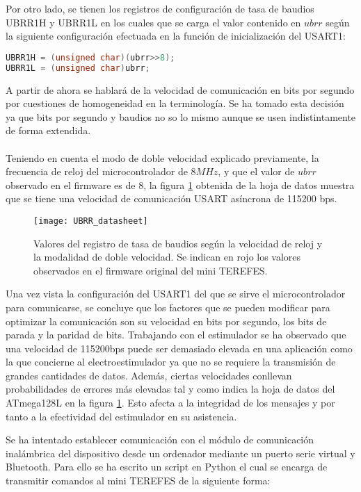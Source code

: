 Por otro lado, se tienen los registros de configuración de tasa de baudios UBRR1H y UBRR1L en los cuales que se carga el valor contenido en $ubrr$ según la siguiente configuración efectuada en la función de inicialización del USART1:\\

\begin{lstlisting}[language=C++,breaklines]
UBRR1H = (unsigned char)(ubrr>>8);
UBRR1L = (unsigned char)ubrr;
\end{lstlisting}

A partir de ahora se hablará de la velocidad de comunicación en bits por segundo por cuestiones de homogeneidad en la terminología. Se ha tomado esta decisión ya que bits por segundo y baudios no so lo mismo aunque se usen indistintamente de forma extendida.
\\
\\
Teniendo en cuenta el modo de doble velocidad explicado previamente, la frecuencia de reloj del microcontrolador de $8MHz$, y que el valor de $ubrr$ observado en el firmware es de 8, la figura \ref{fig:UBRR_datasheet} obtenida de la hoja de datos muestra que se tiene una velocidad de comunicación USART asíncrona de 115200 bps.\\

\begin{figure}[!htb]
\centering
\texttt{[image: UBRR\_datasheet]}
  \caption{Valores del registro de tasa de baudios según la velocidad de reloj y la modalidad de doble velocidad. Se indican en rojo los valores observados en el firmware original del mini TEREFES.}\label{fig:UBRR_datasheet}
\end{figure}

Una vez vista la configuración del USART1 del que se sirve el microcontrolador para comunicarse, se concluye que los factores que se pueden modificar para optimizar la comunicación son su velocidad en bits por segundo, los bits de parada y la paridad de bits. Trabajando con el estimulador se ha observado que una velocidad de 115200bps puede ser demasiado elevada en una aplicación como la que concierne al electroestimulador ya que no se requiere la transmisión de grandes cantidades de datos. Además, ciertas velocidades conllevan probabilidades de errores más elevadas tal y como indica la hoja de datos del ATmega128L en la figura \ref{fig:UBRR_datasheet}. Esto afecta a la integridad de los mensajes y por tanto a la efectividad del estimulador en su asistencia.

Se ha intentado establecer comunicación con el módulo de comunicación inalámbrica del dispositivo desde un ordenador mediante un puerto serie virtual y Bluetooth. Para ello se ha escrito un script en Python el cual se encarga de transmitir comandos al mini TEREFES de la siguiente forma:


